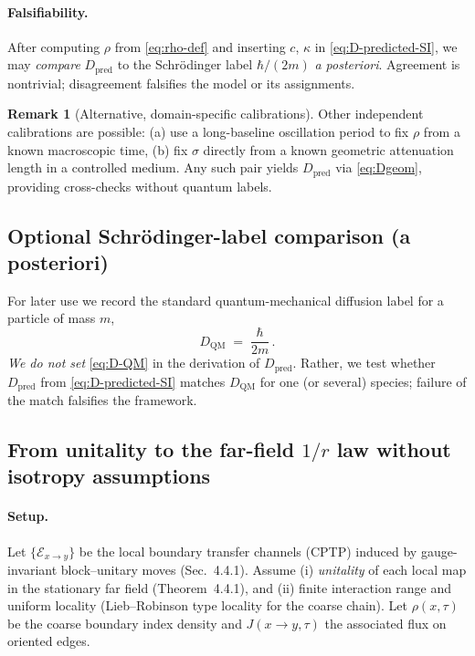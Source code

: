 \documentclass[11pt]{article}
\theoremstyle{plain}
\theoremstyle{definition}
\newtheorem{remark}[theorem]{Remark}
\begin{document}
\paragraph{Falsifiability.}
After computing $\rho$ from \eqref{eq:rho-def} and inserting $c$, $\kappa$ in \eqref{eq:D-predicted-SI},
we may \emph{compare} $D_{\mathrm{pred}}$ to the Schr\"odinger label $\hbar/(2m)$ \emph{a posteriori}.
Agreement is nontrivial; disagreement falsifies the model or its assignments.

\begin{remark}[Alternative, domain-specific calibrations]
  Other independent calibrations are possible: (a) use a long-baseline oscillation period to fix $\rho$ from a known macroscopic time,
  (b) fix $\sigma$ directly from a known geometric attenuation length in a controlled medium.  Any such pair yields $D_{\mathrm{pred}}$
  via \eqref{eq:Dgeom}, providing cross-checks without quantum labels.
\end{remark}

\subsection{Optional Schr\"odinger-label comparison (a posteriori)}\label{subsec:QM-label-check}

For later use we record the standard quantum-mechanical diffusion label for a particle of mass $m$,
\begin{equation}\label{eq:D-QM}
  D_{\mathrm{QM}} \;=\; \frac{\hbar}{2m}\, .
\end{equation}
\emph{We do not set} \eqref{eq:D-QM} in the derivation of $D_{\mathrm{pred}}$.
Rather, we test whether $D_{\mathrm{pred}}$ from \eqref{eq:D-predicted-SI} matches $D_{\mathrm{QM}}$
for one (or several) species; failure of the match falsifies the framework.


\subsection{From unitality to the far-field $1/r$ law without isotropy assumptions}
\label{sec:unitality-to-1overr}

\paragraph{Setup.}
Let $\{\mathcal{E}_{x\to y}\}$ be the local boundary transfer channels (CPTP) induced by gauge-invariant block–unitary moves (Sec.~4.4.1).
Assume (i) \emph{unitality} of each local map in the stationary far field (Theorem~4.4.1), and (ii) finite interaction range and uniform locality (Lieb–Robinson type locality for the coarse chain).
Let $\rho(x,\tau)$ be the coarse boundary index density and $J(x\!\to\!y,\tau)$ the associated flux on oriented edges.
\end{document}
